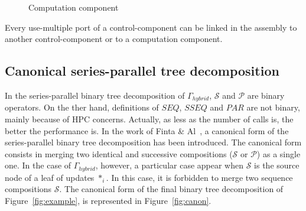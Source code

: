 \begin{figure}[h!]
\captionsetup[subfigure]{labelformat=empty}
\begin{center}
  \caption{Computation component}
\label{fig:control}
\end{center}
\end{figure}

Every use-multiple port of a control-component can be linked in the assembly to another control-component or to a computation component.

\subsection{Canonical series-parallel tree decomposition}
In the series-parallel binary tree decomposition of $\Gamma_{hybrid}$, $\mathcal{S}$ and $\mathcal{P}$ are binary operators. On the ther hand, definitions of $SEQ$, $SSEQ$ and $PAR$ are not binary, mainly because of HPC concerns. Actually, as less as the number of calls is, the better the performance is. In the work of Finta \& Al~\cite{Finta:1996:SUS:235643.235649}, a canonical form of the series-parallel binary tree decomposition has been introduced. The canonical form consists in merging two identical and successive compositions ($\mathcal{S}$ or $\mathcal{P}$) as a single one. In the case of $\Gamma_{hybrid}$, however, a particular case appear when $\mathcal{S}$ is the source node of a leaf of updates $*_i$. In this case, it is forbidden to merge two sequence compositions $\mathcal{S}$. The canonical form of the final binary tree decomposition of Figure~\ref{fig:example}, is represented in Figure~\ref{fig:canon}.

